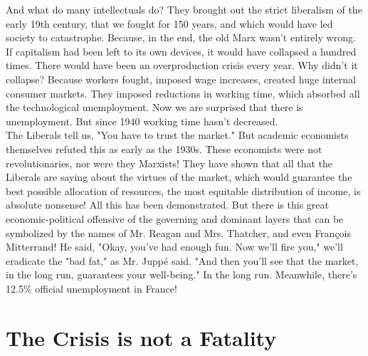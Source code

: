 And what do many intellectuals do? They brought out the strict liberalism of the early 19th century, that we fought for 150 years, and which would have led society to catastrophe. Because, in the end, the old Marx wasn't entirely wrong. If capitalism had been left to its own devices, it would have collapsed a hundred times. There would have been an overproduction crisis every year. Why didn't it collapse? Because workers fought, imposed wage increases, created huge internal consumer markets. They imposed reductions in working time, which absorbed all the technological unemployment. Now we are surprised that there is unemployment. But since 1940 working time hasn't decreased.\\
The Liberals tell us, "You have to trust the market." But academic economists themselves refuted this as early as the 1930s. These economists were not revolutionaries, nor were they Marxists! They have shown that all that the Liberals are saying about the virtues of the market, which would guarantee the best possible allocation of resources, the most equitable distribution of income, is absolute nonsense! All this has been demonstrated. But there is this great economic-political offensive of the governing and dominant layers that can be symbolized by the names of Mr. Reagan and Mrs. Thatcher, and even François Mitterrand! He said, "Okay, you've had enough fun. Now we'll fire you," we'll eradicate the "bad fat," as Mr. Juppé said. "And then you'll see that the market, in the long run, guarantees your well-being." In the long run. Meanwhile, there's 12.5\% official unemployment in France!

\section*{The Crisis is not a Fatality}

